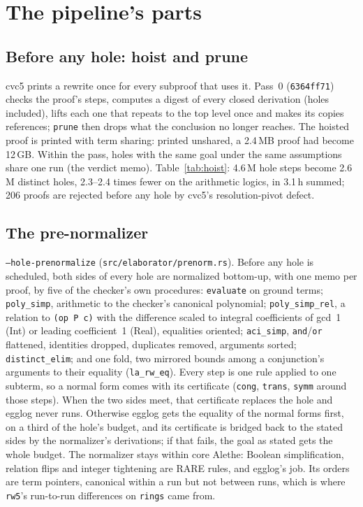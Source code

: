 \documentclass[11pt,a4paper]{article}
\newcommand{\code}[1]{\texttt{#1}}
\begin{document}
\section{The pipeline's parts}\label{sec:parts}

\subsection{Before any hole: hoist and prune}\label{sec:hoist}

cvc5 prints a rewrite once for every subproof that uses it. Pass~0
(\code{6364ff71}) checks the proof's steps, computes a digest of every
closed derivation (holes included), lifts each one that repeats to the top
level once and makes its copies references; \code{prune} then drops what
the conclusion no longer reaches. The hoisted proof is printed with term
sharing: printed unshared, a 2.4\,MB proof had become 12\,GB. Within the
pass, holes with the same goal under the same assumptions share one run (the
verdict memo). Table~\ref{tab:hoist}: 4.6\,M hole steps become 2.6\,M
distinct holes, 2.3--2.4 times fewer on the arithmetic logics, in 3.1\,h
summed; 206 proofs are rejected before any hole by cvc5's resolution-pivot
defect.

\begin{table}[htbp]
  \centering\small
  \resizebox{\textwidth}{!}{}
  \caption{Pass 0 on the proofs cvc5 completed in 60\,s.}
  \label{tab:hoist}
\end{table}

\subsection{The pre-normalizer}\label{sec:prenorm}

\code{--hole-prenormalize} (\code{src/elaborator/prenorm.rs}). Before any
hole is scheduled, both sides of every hole are normalized bottom-up, with
one memo per proof, by five of the checker's own procedures:
\code{evaluate} on ground terms; \code{poly\_simp}, arithmetic to the
checker's canonical polynomial; \code{poly\_simp\_rel}, a relation to
\code{(op P c)} with the difference scaled to integral coefficients of gcd~1
(Int) or leading coefficient~1 (Real), equalities oriented; \code{aci\_simp},
\code{and}/\code{or} flattened, identities dropped, duplicates removed,
arguments sorted; \code{distinct\_elim}; and one fold, two mirrored bounds
among a conjunction's arguments to their equality (\code{la\_rw\_eq}). Every
step is one rule applied to one subterm, so a normal form comes with its
certificate (\code{cong}, \code{trans}, \code{symm} around those steps).
When the two sides meet, that certificate replaces the hole and egglog never
runs. Otherwise egglog gets the equality of the normal forms first, on a
third of the hole's budget, and its certificate is bridged back to the stated
sides by the normalizer's derivations; if that fails, the goal as stated
gets the whole budget. The normalizer stays within core Alethe: Boolean
simplification, relation flips and integer tightening are RARE rules, and
egglog's job. Its orders are term pointers, canonical within a run but not
between runs, which is where \code{rw5}'s run-to-run differences on
\code{rings} came from.
\end{document}
